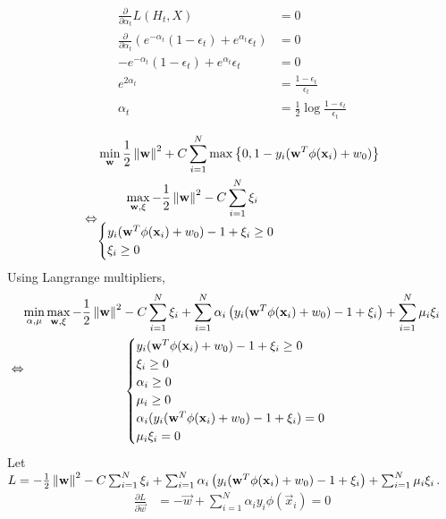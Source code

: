 \documentclass{introtosml}
\newcommand{\x}{\vec{x}}
\newcommand{\w}{\vec{w}}
\newcommand{\e}[1]{\epsilon_{#1}}
\newcommand\ywxxi{y_i (\w^T \phi(\x_i) + w_0) - 1 + \xi_i}
\newcommand\loss{
  - \frac{1}{2} \norm{\w}^2 - C \sum_{i=1}^N \xi_i
  + \sum_{i=1}^N \alpha_i \left( y_i (\w^T \phi(\x_i) + w_0) - 1 + \xi_i \right)
  + \sum_{i=1}^N \mu_i \xi_i}
\begin{document}
\begin{p}
  \item
    \begin{align*}
      \frac{\partial}{\partial \alpha_t} L(H_t, X) & = 0 \\
      \frac{\partial}{\partial \alpha_t} \left(
        e^{-\alpha_t} (1 - \e{t}) + e^{\alpha_t} \e{t}
      \right) & = 0 \\
      - e^{-\alpha_t} (1 - \e{t}) + e^{\alpha_t} \e{t} & = 0 \\
      e^{2 \alpha_t} & = \frac{1 - \e{t}}{\e{t}} \\
      \alpha_t & = \frac{1}{2} \log \frac{1 - \e{t}}{\e{t}}
    \end{align*}

  \item
    \begin{align*}
      & \min_\w \frac{1}{2} \norm{\w}^2
      + C \sum_{i=1}^N \max \left\{ 0, 1 - y_i (\w^T \phi(\x_i) + w_0) \right\} \\
      \Leftrightarrow & \begin{gathered}
        \max_{\w, \xi} - \frac{1}{2} \norm{\w}^2 - C \sum_{i=1}^N \xi_i \\
        \begin{cases}
          y_i (\w^T \phi(\x_i) + w_0) - 1 + \xi_i \ge 0 \\
          \xi_i \ge 0
        \end{cases}
      \end{gathered}
    \end{align*}
    Using Langrange multipliers,
    \begin{align*}
      \Leftrightarrow & \begin{gathered}
        \min_{\alpha, \mu} \max_{\w, \xi} \loss \\
        \begin{cases}
          \ywxxi \ge 0 \\
          \xi_i \ge 0 \\
          \alpha_i \ge 0 \\
          \mu_i \ge 0 \\
          \alpha_i (\ywxxi) = 0 \\
          \mu_i \xi_i = 0
        \end{cases}
      \end{gathered}
    \end{align*}
    Let $L = \loss$.
    \begin{align*}
      \frac{\partial L}{\partial \w} & = - \w + \sum_{i=1}^N \alpha_i y_i \phi(\x_i) = 0 \\

\end{align*}
\end{p}
\end{document}
